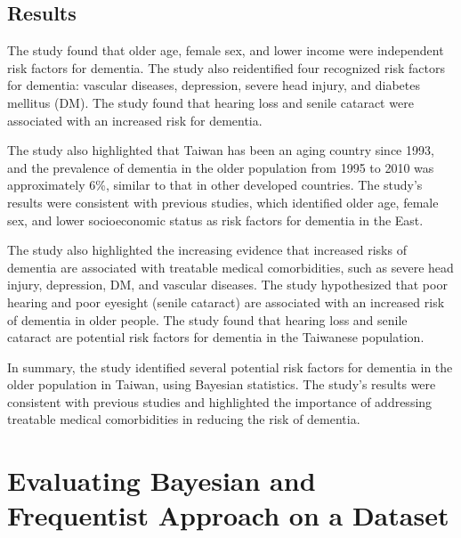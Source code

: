 \documentclass[12pt,letterpaper]{article}
\begin{document}
\subsection{Results}
The study found that older age, female sex, and lower income were independent risk factors for dementia. The study also reidentified four recognized risk factors for dementia: vascular diseases, depression, severe head injury, and diabetes mellitus (DM). The study found that hearing loss and senile cataract were associated with an increased risk for dementia.

The study also highlighted that Taiwan has been an aging country since 1993, and the prevalence of dementia in the older population from 1995 to 2010 was approximately 6\%, similar to that in other developed countries. The study's results were consistent with previous studies, which identified older age, female sex, and lower socioeconomic status as risk factors for dementia in the East.

The study also highlighted the increasing evidence that increased risks of dementia are associated with treatable medical comorbidities, such as severe head injury, depression, DM, and vascular diseases. The study hypothesized that poor hearing and poor eyesight (senile cataract) are associated with an increased risk of dementia in older people. The study found that hearing loss and senile cataract are potential risk factors for dementia in the Taiwanese population.

In summary, the study identified several potential risk factors for dementia in the older population in Taiwan, using Bayesian statistics. The study's results were consistent with previous studies and highlighted the importance of addressing treatable medical comorbidities in reducing the risk of dementia.


\section{Evaluating Bayesian and Frequentist Approach on a Dataset}
\end{document}
